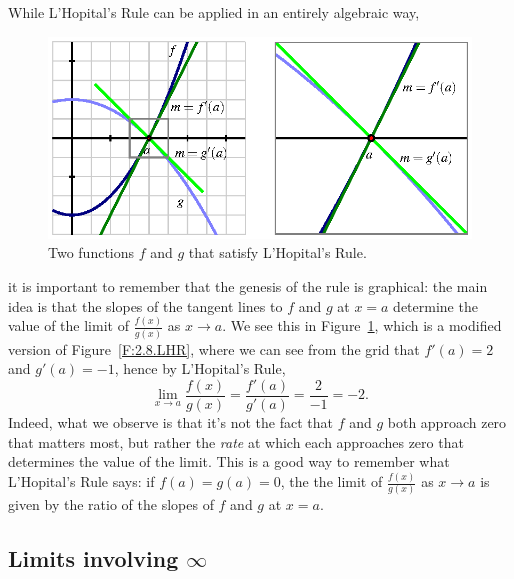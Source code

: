 

While L'Hopital's Rule can be applied in an entirely algebraic way, 
\begin{figure}[h]
\begin{center}
\includegraphics{figures/2_8_LHR2.eps}
\caption{Two functions $f$ and $g$ that satisfy L'Hopital's Rule.} \label{F:2.8.LHR2}
\end{center}
\end{figure}
it is important to remember that the genesis of the rule is graphical:  the main idea is that the slopes of the tangent lines to $f$ and $g$ at $x = a$ determine the value of the limit of $\frac{f(x)}{g(x)}$ as $x \to a$.  We see this in Figure~\ref{F:2.8.LHR2}, which is a modified version of Figure~\ref{F:2.8.LHR}, where we can see from the grid that $f'(a) = 2$ and $g'(a) = -1$, hence by L'Hopital's Rule, 
$$\lim_{x \to a}\frac{f(x)}{g(x)} = \frac{f'(a)}{g'(a)} = \frac{2}{-1} = -2.$$
Indeed, what we observe is that it's not the fact that $f$ and $g$ both approach zero that matters most, but rather the \emph{rate} at which each approaches zero that determines the value of the limit.  This is a good way to remember what L'Hopital's Rule says:  if $f(a) = g(a) = 0$, the the limit of $\frac{f(x)}{g(x)}$ as $x \to a$ is given by the ratio of the slopes of $f$ and $g$ at $x = a$.



\subsection*{Limits involving $\infty$}

